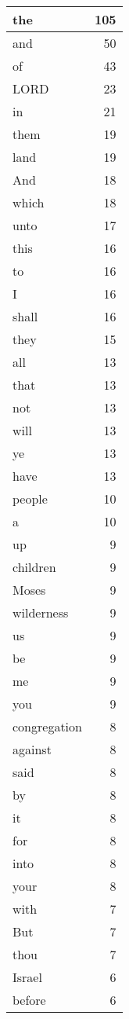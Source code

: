 \begin{center}
\begin{longtable}{l|r}
\hline \hline
\endlastfoot
the & 105 \\ \hline
and & 50 \\ \hline
of & 43 \\ \hline
LORD & 23 \\ \hline
in & 21 \\ \hline
them & 19 \\ \hline
land & 19 \\ \hline
And & 18 \\ \hline
which & 18 \\ \hline
unto & 17 \\ \hline
this & 16 \\ \hline
to & 16 \\ \hline
I & 16 \\ \hline
shall & 16 \\ \hline
they & 15 \\ \hline
all & 13 \\ \hline
that & 13 \\ \hline
not & 13 \\ \hline
will & 13 \\ \hline
ye & 13 \\ \hline
have & 13 \\ \hline
people & 10 \\ \hline
a & 10 \\ \hline
up & 9 \\ \hline
children & 9 \\ \hline
Moses & 9 \\ \hline
wilderness & 9 \\ \hline
us & 9 \\ \hline
be & 9 \\ \hline
me & 9 \\ \hline
you & 9 \\ \hline
congregation & 8 \\ \hline
against & 8 \\ \hline
said & 8 \\ \hline
by & 8 \\ \hline
it & 8 \\ \hline
for & 8 \\ \hline
into & 8 \\ \hline
your & 8 \\ \hline
with & 7 \\ \hline
But & 7 \\ \hline
thou & 7 \\ \hline
Israel & 6 \\ \hline
before & 6 \\ \hline

\end{longtable}
\end{center}
